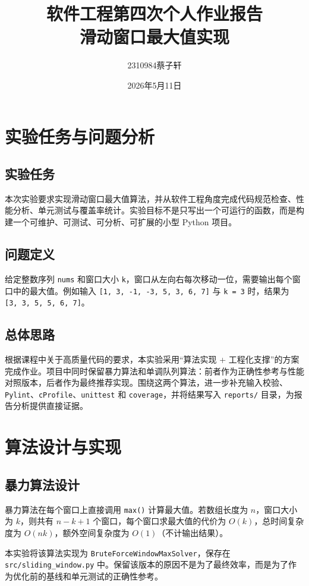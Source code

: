 \documentclass[UTF8,a4paper,12pt]{ctexart}
\title{软件工程第四次个人作业报告\\滑动窗口最大值实现}
\author{2310984\quad 蔡子轩}
\date{2026年5月11日}
\begin{document}
\maketitle
\tableofcontents
\newpage

\section{实验任务与问题分析}
\subsection{实验任务}
本次实验要求实现滑动窗口最大值算法，并从软件工程角度完成代码规范检查、性能分析、单元测试与覆盖率统计。实验目标不是只写出一个可运行的函数，而是构建一个可维护、可测试、可分析、可扩展的小型 Python 项目。

\subsection{问题定义}
给定整数序列 \texttt{nums} 和窗口大小 \texttt{k}，窗口从左向右每次移动一位，需要输出每个窗口中的最大值。例如输入
\texttt{[1, 3, -1, -3, 5, 3, 6, 7]} 与 \texttt{k = 3} 时，结果为
\texttt{[3, 3, 5, 5, 6, 7]}。

\subsection{总体思路}
根据课程中关于高质量代码的要求，本实验采用“算法实现 + 工程化支撑”的方案完成作业。项目中同时保留暴力算法和单调队列算法：前者作为正确性参考与性能对照版本，后者作为最终推荐实现。围绕这两个算法，进一步补充输入校验、\texttt{Pylint}、\texttt{cProfile}、\texttt{unittest} 和 \texttt{coverage}，并将结果写入 \texttt{reports/} 目录，为报告分析提供直接证据。

\section{算法设计与实现}
\subsection{暴力算法设计}
暴力算法在每个窗口上直接调用 \texttt{max()} 计算最大值。若数组长度为 \(n\)，窗口大小为 \(k\)，则共有 \(n-k+1\) 个窗口，每个窗口求最大值的代价为 \(O(k)\)，总时间复杂度为 \(O(nk)\)，额外空间复杂度为 \(O(1)\)（不计输出结果）。

本实验将该算法实现为 \texttt{BruteForceWindowMaxSolver}，保存在
\texttt{src/sliding\_window.py} 中。保留该版本的原因不是为了最终效率，而是为了作为优化前的基线和单元测试的正确性参考。
\end{document}
